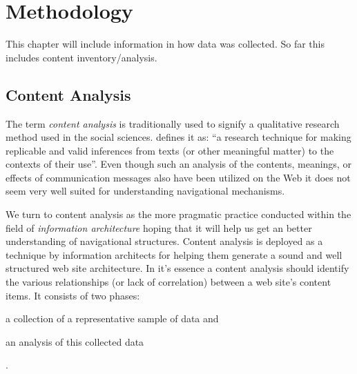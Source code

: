 \chapter{Methodology}
\label{chapter:methodology}

This chapter will include information in how data was collected. So far this
includes content inventory/analysis.

\section{Content Analysis}

The term \emph{content analysis} is traditionally used to signify a
qualitative research method used in the social sciences.
\citet[p.~18]{krippendorff03} defines it as:
``a research technique for making replicable and valid
inferences from texts (or other meaningful matter) to the contexts of their
use''. Even though such an analysis of the contents, meanings, or effects of
communication messages also have been utilized on the Web \citep{weare00}
it does not seem very well suited for understanding navigational mechanisms.

We turn to content analysis as the more pragmatic practice conducted within
the field of \emph{information architecture}%
 hoping that it will help us get an better understanding of navigational
structures.
Content analysis is deployed as a technique by information architects for
helping them generate a sound and well structured web site architecture.
In it's essence a content analysis should identify the various
relationships (or lack of correlation) between a web site's content items.
It consists of two phases:
\begin{inparaenum}[(i)]
  \item a collection of a representative sample of data and
  \item an analysis of this collected data
\end{inparaenum}
\citep[pp.~241--243]{morville06}.

